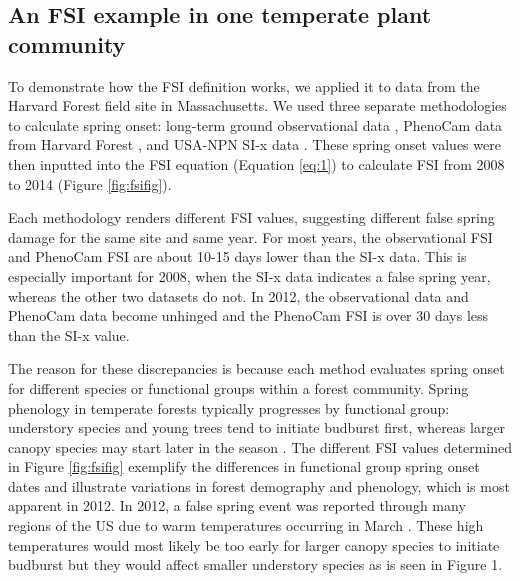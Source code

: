 \documentclass{article}\usepackage[]{graphicx}\usepackage[]{color}
\begin{document}
\subsection{An FSI example in one temperate plant community} %
To demonstrate how the FSI definition works, we applied it to data from the Harvard Forest field site in Massachusetts. We used three separate methodologies to calculate spring onset: long-term ground observational data \citep{Okeefe2014}, PhenoCam data from Harvard Forest \citep{Richardson2015}, and USA-NPN SI-x data \citep{USA-NPN2016}. These spring onset values were then inputted into the FSI equation (Equation \ref{eq:1}) to calculate FSI from 2008 to 2014 (Figure \ref{fig:fsifig}). 

Each methodology renders different FSI values, suggesting different false spring damage for the same site and same year. For most years, the observational FSI and PhenoCam FSI are about 10-15 days lower than the SI-x data. This is especially important for 2008, when the SI-x data indicates a false spring year, whereas the other two datasets do not. In 2012, the observational data and PhenoCam data become unhinged and the PhenoCam FSI is over 30 days less than the SI-x value.

The reason for these discrepancies is because each method evaluates spring onset for different species or functional groups within a forest community. Spring phenology in temperate forests typically progresses by functional group: understory species and young trees tend to initiate budburst first, whereas larger canopy species may start later in the season \citep{Richardson2009, Xin2016}. The different FSI values determined in Figure \ref{fig:fsifig} exemplify the differences in functional group spring onset dates and illustrate variations in forest demography and phenology, which is most apparent in 2012. In 2012, a false spring event was reported through many regions of the US due to warm temperatures occurring in March \citep{Ault2015}. These high temperatures would most likely be too early for larger canopy species to initiate budburst but they would affect smaller understory species as is seen in Figure 1. 
\end{document}

